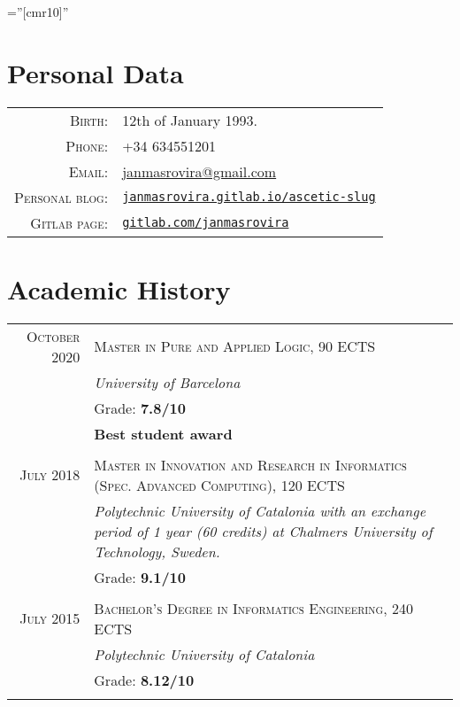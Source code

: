 \documentclass[a4paper,11pt]{article}
\begin{document}
\pagestyle{empty}

\font\fb=''[cmr10]''

\par{\bigskip\par}

\section{Personal Data}

\begin{tabular}{rl}
\textsc{Birth:} & 12th of January 1993.\\
\textsc{Phone:} & +34 634551201\\
\textsc{Email:} & \href{mailto:janmasrovira@gmail.com}{janmasrovira@gmail.com} \\
\textsc{Personal blog:} & \href{https://janmasrovira.gitlab.io/ascetic-slug/}{\texttt{janmasrovira.gitlab.io/ascetic-slug}} \\
  \textsc{Gitlab page:} & \href{https://gitlab.com/janmasrovira}{\texttt{gitlab.com/janmasrovira}}
\end{tabular}

\section{Academic History}

\begin{tabular}{r|p{11cm}}
  \textsc{October 2020} & \textsc{Master in Pure and Applied Logic, 90 ECTS} \\
 & \emph{University of Barcelona}\\
   & Grade: \textbf{7.8/10} \\
   & \textbf{Best student award} \\
\multicolumn{2}{c}{} \\

  \textsc{July 2018} & \textsc{Master in Innovation and Research in Informatics (Spec. Advanced Computing), 120 ECTS} \\
               & \emph{Polytechnic University of Catalonia with an exchange period of 1 year (60 credits) at Chalmers University of Technology, Sweden.}\\
  & Grade: \textbf{9.1/10} \\
  \multicolumn{2}{c}{} \\

  \textsc{July 2015} & \textsc{Bachelor's Degree in Informatics Engineering, 240 ECTS} \\
               & \emph{Polytechnic University of Catalonia}\\
               & Grade: \textbf{8.12/10} \\
  \multicolumn{2}{c}{} \\
\end{tabular}
\end{document}
